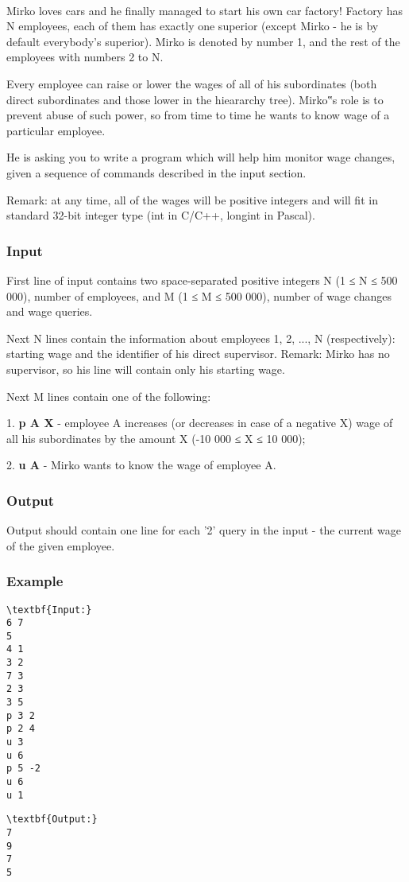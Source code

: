 

 

Mirko loves cars and he finally managed to start his own car factory! Factory has N employees, each of them has exactly one superior (except Mirko - he is by default everybody's superior). Mirko is denoted by number 1, and the rest of the employees with numbers 2 to N.




Every employee can raise or lower the wages of all of his subordinates (both direct subordinates and those lower in the hieararchy tree). Mirko‟s role is to prevent abuse of such power, so from time to time he wants to know wage of a particular employee.


He is asking you to write a program which will help him monitor wage changes, given a sequence of commands described in the input section.

Remark: at any time, all of the wages will be positive integers and will fit in standard 32-bit integer type (int in C/C++, longint in Pascal).

\subsubsection{Input}

First line of input contains two space-separated positive integers N (1 ≤ N ≤ 500 000), number of employees, and M (1 ≤ M ≤ 500 000), number of wage changes and wage queries.




Next N lines contain the information about employees 1, 2, ..., N (respectively): starting wage and the identifier of his direct supervisor. Remark: Mirko has no supervisor, so his line will contain only his starting wage.




Next M lines contain one of the following:


1. \textbf{ p A X } - employee A increases (or decreases in case of a negative X) wage of all his subordinates by the amount X (-10 000 ≤ X ≤ 10 000);


2. \textbf{ u A } - Mirko wants to know the wage of employee A.

\subsubsection{Output}

Output should contain one line for each '2' query in the input - the current wage of the given employee.

\subsubsection{Example}
\begin{verbatim}
\textbf{Input:}
6 7 
5 
4 1 
3 2 
7 3 
2 3 
3 5 
p 3 2 
p 2 4 
u 3 
u 6 
p 5 -2 
u 6 
u 1
\end{verbatim}
\begin{verbatim}
\textbf{Output:}
7 
9
7
5\end{verbatim}
